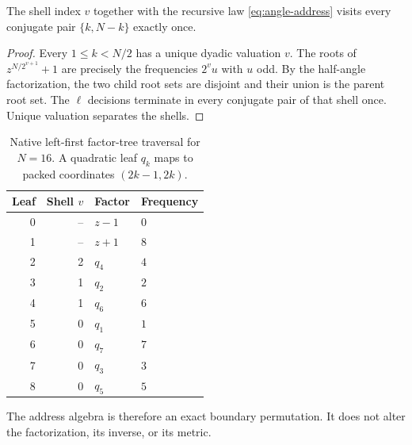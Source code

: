 \begin{proposition}
The shell index $v$ together with the recursive law
\eqref{eq:angle-address} visits every conjugate pair $\{k,N-k\}$ exactly once.
\end{proposition}
\begin{proof}
Every $1\le k<N/2$ has a unique dyadic valuation $v$.  The roots of
$z^{N/2^{v+1}}+1$ are precisely the frequencies $2^v u$ with $u$ odd.  By the
half-angle factorization, the two child root sets are disjoint and their union
is the parent root set.  The $\ell$ decisions terminate in every conjugate pair
of that shell once.  Unique valuation separates the shells.
\end{proof}

\begin{table}[t]
\caption{Native left-first factor-tree traversal for $N=16$.  A quadratic leaf
$q_k$ maps to packed coordinates $(2k-1,2k)$.}
\label{tab:n16-labels}
\centering
\begin{tabular}{@{}rrll@{}}
\toprule
Leaf & Shell $v$ & Factor & Frequency\\
\midrule
0 & -- & $z-1$ & $0$\\
1 & -- & $z+1$ & $8$\\
2 & 2 & $q_4$ & $4$\\
3 & 1 & $q_2$ & $2$\\
4 & 1 & $q_6$ & $6$\\
5 & 0 & $q_1$ & $1$\\
6 & 0 & $q_7$ & $7$\\
7 & 0 & $q_3$ & $3$\\
8 & 0 & $q_5$ & $5$\\
\bottomrule
\end{tabular}
\end{table}

The address algebra is therefore an exact boundary permutation.  It does not
alter the factorization, its inverse, or its metric.
